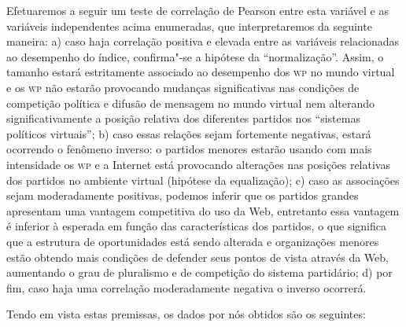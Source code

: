 Efetuaremos a seguir um teste de correlação de Pearson entre esta
variável e as variáveis independentes acima enumeradas, que
interpretaremos da seguinte maneira: a) caso haja correlação positiva e
elevada entre as variáveis relacionadas ao desempenho do índice,
confirma"-se a hipótese da ``normalização''. Assim, o tamanho estará
estritamente associado ao desempenho dos \textsc{wp} no mundo virtual e os \textsc{wp} não
estarão provocando mudanças significativas nas condições de competição
política e difusão de mensagem no mundo virtual nem alterando
significativamente a posição relativa dos diferentes partidos nos
``sistemas políticos virtuais''; b) caso essas relações sejam fortemente
negativas, estará ocorrendo o fenômeno inverso: o partidos menores
estarão usando com mais intensidade os \textsc{wp} e a Internet está provocando
alterações nas posições relativas dos partidos no ambiente virtual
(hipótese da equalização); c) caso as associações sejam moderadamente
positivas, podemos inferir que os partidos grandes apresentam uma
vantagem competitiva do uso da Web, entretanto essa vantagem é inferior
à esperada em função das características dos partidos, o que significa
que a estrutura de oportunidades está sendo alterada e organizações
menores estão obtendo mais condições de defender seus pontos de vista
através da Web, aumentando o grau de pluralismo e de competição do
sistema partidário; d) por fim, caso haja uma correlação moderadamente
negativa o inverso ocorrerá.

Tendo em vista estas premissas, os dados por nós obtidos são os
seguintes:

\pagebreak


